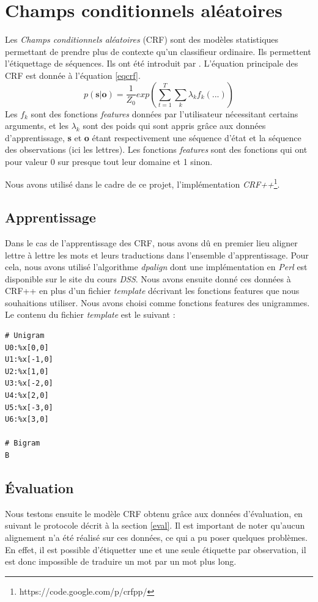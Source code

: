 \documentclass{article}
\begin{document}
\section{Champs conditionnels aléatoires}
Les \emph{Champs conditionnels aléatoires} (CRF) sont des modèles statistiques permettant de prendre plus de contexte qu'un classifieur ordinaire. Ils permettent l'étiquettage de séquences. Ils ont été introduit par \cite{Lafferty01}. L'équation principale des CRF est donnée à l'équation \ref{eqcrf}.
\begin{equation}
p(\textbf{s}|\textbf{o}) = \frac{1}{Z_0}exp(\sum_{t=1}^T\sum_k \lambda_k f_k(...))
\label{eqcrf}
\end{equation}
Les $f_k$ sont des fonctions \emph{features} données par l'utilisateur nécessitant certains arguments, et les $\lambda_k$ sont des poids qui sont appris grâce aux données d'apprentissage, \textbf{s} et \textbf{o} étant respectivement une séquence d'état et la séquence des observations (ici les lettres). Les fonctions \emph{features} sont des fonctions qui ont pour valeur 0 sur presque tout leur domaine et 1 sinon.

Nous avons utilisé dans le cadre de ce projet, l'implémentation \emph{CRF++}\footnote{https://code.google.com/p/crfpp/}.

\subsection{Apprentissage}
Dans le cas de l'apprentissage des CRF, nous avons dû en premier lieu aligner lettre à lettre les mots et leurs traductions dans l'ensemble d'apprentissage. Pour cela, nous avons utilisé l'algorithme \emph{dpalign} dont une implémentation en \emph{Perl} est disponible sur le site du cours \emph{DSS}. Nous avons ensuite donné ces données à CRF++ en plus d'un fichier \emph{template} décrivant les fonctions features que nous souhaitions utiliser. Nous avons choisi comme fonctions features des unigrammes. Le contenu du fichier \emph{template} est le suivant :
\begin{verbatim}
# Unigram
U0:%x[0,0]
U1:%x[-1,0]
U2:%x[1,0]
U3:%x[-2,0]
U4:%x[2,0]
U5:%x[-3,0]
U6:%x[3,0]

# Bigram
B
\end{verbatim}

\subsection{Évaluation}
Nous testons ensuite le modèle CRF obtenu grâce aux données d'évaluation, en suivant le protocole décrit à la section \ref{eval}. Il est important de noter qu'aucun alignement n'a été réalisé sur ces données, ce qui a pu poser quelques problèmes. En effet, il est possible d'étiquetter une et une seule étiquette par observation, il est donc impossible de traduire un mot par un mot plus long.
\end{document}
